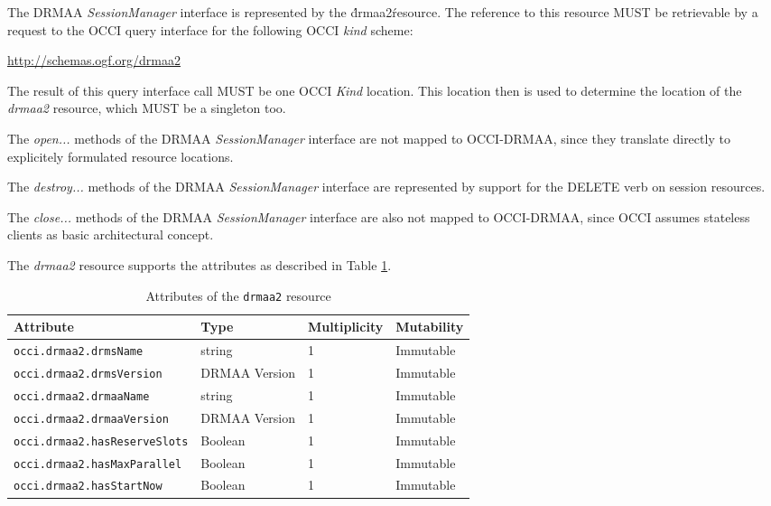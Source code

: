 \documentclass[10pt]{article}
\newcommand{\h}[1]{\lstinline|#1|}
\begin{document}
The DRMAA \emph{SessionManager} interface is represented by the \'drmaa2\' resource. The reference to this resource MUST be retrievable by a request to the OCCI query interface for the following OCCI \emph{kind} scheme:

\url{http://schemas.ogf.org/drmaa2}

The result of this query interface call MUST be one OCCI \emph{Kind} location. This location then is used to determine the location of the \emph{drmaa2} resource, which MUST be a singleton too.  

The \emph{open...} methods of the DRMAA \emph{SessionManager} interface are not mapped to OCCI-DRMAA, since they translate directly to explicitely formulated resource locations.

The \emph{destroy...} methods of the DRMAA \emph{SessionManager} interface are represented by support for the DELETE verb on session resources. 

The \emph{close...} methods of the DRMAA \emph{SessionManager} interface are also not mapped to OCCI-DRMAA, since OCCI assumes stateless clients as basic architectural concept.

The \emph{drmaa2} resource supports the attributes as described in Table \ref{tab:globalattributes}.

\begin{table}[ht]
\centering
\begin{tabularx}{\textwidth}{|l|X|X|X|}
\hline
Attribute                       & Type            & Multiplicity & Mutability \\
\hline
\h{occi.drmaa2.drmsName}        & string          & 1            & Immutable \\ %
\h{occi.drmaa2.drmsVersion}     & DRMAA Version   & 1            & Immutable \\ %
\h{occi.drmaa2.drmaaName}       & string          & 1            & Immutable \\ %
\h{occi.drmaa2.drmaaVersion}    & DRMAA Version   & 1            & Immutable \\ %
\h{occi.drmaa2.hasReserveSlots} & Boolean         & 1            & Immutable \\ %
\h{occi.drmaa2.hasMaxParallel}  & Boolean         & 1            & Immutable \\ %
\h{occi.drmaa2.hasStartNow}     & Boolean         & 1            & Immutable \\ %
\hline
\end{tabularx}
\caption{Attributes of the \h{drmaa2} resource}
\label{tab:globalattributes}
\end{table}
\end{document}
